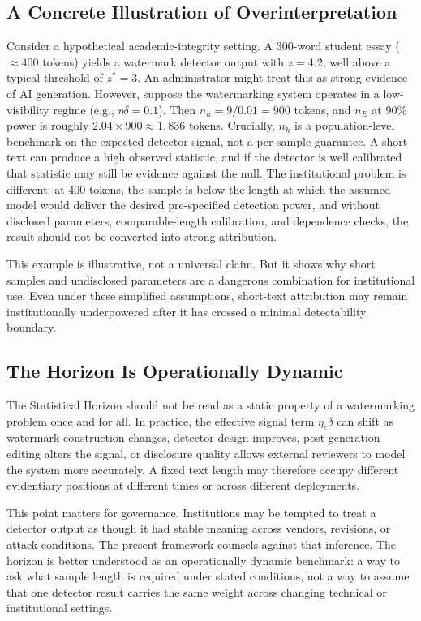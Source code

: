 \documentclass[11pt]{article}
\begin{document}
\subsection{A Concrete Illustration of Overinterpretation}

Consider a hypothetical academic-integrity setting. A 300-word student essay
($\approx 400$ tokens) yields a watermark detector output with $z = 4.2$, well
above a typical threshold of $z^* = 3$. An administrator might treat this as strong
evidence of AI generation. However, suppose the watermarking system operates in a
low-visibility regime (e.g., $\eta\delta = 0.1$). Then $n_h = 9/0.01 = 900$ tokens,
and $n_E$ at 90\% power is roughly $2.04 \times 900 \approx 1{,}836$ tokens.
Crucially, $n_h$ is a population-level benchmark on the expected detector signal,
not a per-sample guarantee. A short text can produce a high observed statistic, and
if the detector is well calibrated that statistic may still be evidence against the
null. The institutional problem is different: at 400 tokens, the sample is below the
length at which the assumed model would deliver the desired pre-specified detection
power, and without disclosed parameters, comparable-length calibration, and
dependence checks, the result should not be converted into strong attribution.

This example is illustrative, not a universal claim. But it shows why short samples
and undisclosed parameters are a dangerous combination for institutional use. Even
under these simplified assumptions, short-text attribution may remain
institutionally underpowered after it has crossed a minimal detectability boundary.

\subsection{The Horizon Is Operationally Dynamic}

The Statistical Horizon should not be read as a static property of a watermarking
problem once and for all. In practice, the effective signal term $\eta_e\delta$ can
shift as watermark construction changes, detector design improves, post-generation
editing alters the signal, or disclosure quality allows external reviewers to model
the system more accurately. A fixed text length may therefore occupy different
evidentiary positions at different times or across different deployments.

This point matters for governance. Institutions may be tempted to treat a detector
output as though it had stable meaning across vendors, revisions, or attack
conditions. The present framework counsels against that inference. The horizon is
better understood as an operationally dynamic benchmark: a way to ask what sample
length is required under stated conditions, not a way to assume that one detector
result carries the same weight across changing technical or institutional settings.
\end{document}
